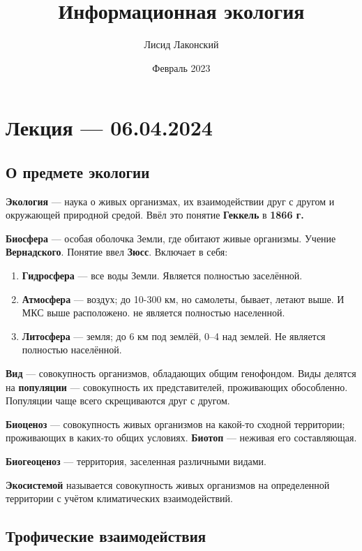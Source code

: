 \documentclass{article}
\title{Информационная экология}
\author{Лисид Лаконский}
\date{Февраль 2023}
\begin{document}
\raggedright

\maketitle

\tableofcontents
\pagebreak

\section{Лекция — 06.04.2024}

\subsection{О предмете экологии}

\textbf{Экология} — наука о живых организмах, их взаимодействии друг с другом и окружающей природной средой. Ввёл это понятие \textbf{Геккель} в \textbf{1866 г.}

\textbf{Биосфера} — особая оболочка Земли, где обитают живые организмы. Учение \textbf{Вернадского}. Понятие ввел \textbf{Зюсс}. Включает в себя:

\begin{enumerate}
    \item \textbf{Гидросфера} — все воды Земли. Является полностью заселённой.
    \item \textbf{Атмосфера} — воздух; до 10-300 км, но самолеты, бывает, летают выше. И МКС выше расположено. не является полностью населенной.
    \item \textbf{Литосфера} — земля; до 6 км под землёй, 0–4 над землей. Не является полностью населённой.
\end{enumerate}

\textbf{Вид} — совокупность организмов, обладающих общим генофондом. Виды делятся на \textbf{популяции} — совокупность их представителей, проживающих обособленно. Популяции чаще всего скрещиваются друг с другом.

\textbf{Биоценоз} — совокупность живых организмов на какой-то сходной территории; проживающих в каких-то общих условиях. \textbf{Биотоп} — неживая его составляющая.

\textbf{Биогеоценоз} — территория, заселенная различными видами.

\textbf{Экосистемой} называется совокупность живых организмов на определенной территории с учётом климатических взаимодействий.

\subsection{Трофические взаимодействия}
\end{document}
